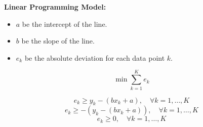 \documentclass{article}
\begin{document}
\textbf{Linear Programming Model:}

\begin{itemize}
    \item \( a \) be the intercept of the line.
    \item \( b \) be the slope of the line.
    \item \( e_k \) be the absolute deviation for each data point \( k \).
\end{itemize}

\[
\min \sum_{k=1}^{K} e_k
\]

\[
e_k \geq y_k - (bx_k + a), \quad \forall k = 1, \ldots, K
\]
\[
e_k \geq -(y_k - (bx_k + a)), \quad \forall k = 1, \ldots, K
\]
\[
e_k \geq 0, \quad \forall k = 1, \ldots, K
\]
\end{document}
